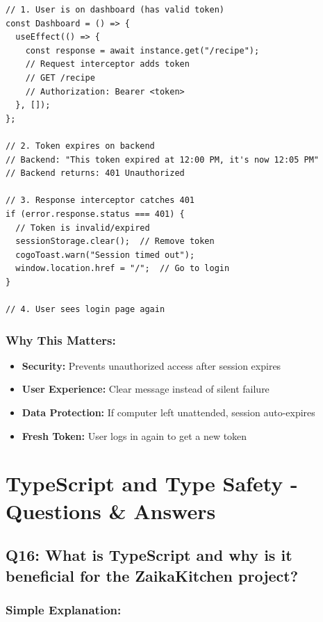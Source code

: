 \documentclass[12pt]{article}
\begin{document}
\begin{lstlisting}
// 1. User is on dashboard (has valid token)
const Dashboard = () => {
  useEffect(() => {
    const response = await instance.get("/recipe");
    // Request interceptor adds token
    // GET /recipe
    // Authorization: Bearer <token>
  }, []);
};

// 2. Token expires on backend
// Backend: "This token expired at 12:00 PM, it's now 12:05 PM"
// Backend returns: 401 Unauthorized

// 3. Response interceptor catches 401
if (error.response.status === 401) {
  // Token is invalid/expired
  sessionStorage.clear();  // Remove token
  cogoToast.warn("Session timed out");
  window.location.href = "/";  // Go to login
}

// 4. User sees login page again
\end{lstlisting}

\subsubsection*{Why This Matters:}

\begin{itemize}
    \item \textbf{Security:} Prevents unauthorized access after session expires
    \item \textbf{User Experience:} Clear message instead of silent failure
    \item \textbf{Data Protection:} If computer left unattended, session auto-expires
    \item \textbf{Fresh Token:} User logs in again to get a new token
\end{itemize}

\section{TypeScript and Type Safety - Questions \& Answers}

\subsection{Q16: What is TypeScript and why is it beneficial for the ZaikaKitchen project?}

\subsubsection*{Simple Explanation:}
\end{document}
